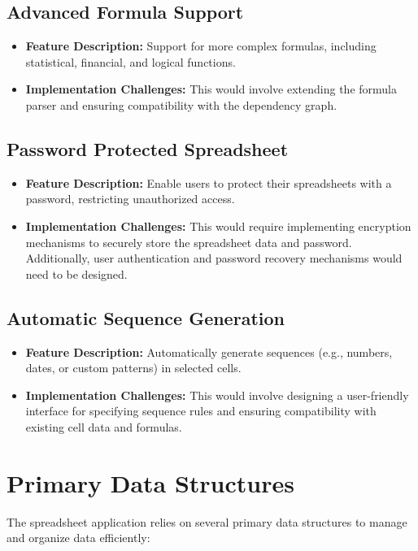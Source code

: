\documentclass{article}
\begin{document}
\subsection{Advanced Formula Support}
\begin{itemize}
    \item \textbf{Feature Description:} Support for more complex formulas, including statistical, financial, and logical functions.
    \item \textbf{Implementation Challenges:} This would involve extending the formula parser and ensuring compatibility with the dependency graph.
\end{itemize}

\subsection{Password Protected Spreadsheet}
\begin{itemize}
    \item \textbf{Feature Description:} Enable users to protect their spreadsheets with a password, restricting unauthorized access.
    \item \textbf{Implementation Challenges:} This would require implementing encryption mechanisms to securely store the spreadsheet data and password. Additionally, user authentication and password recovery mechanisms would need to be designed.
\end{itemize}

\subsection{Automatic Sequence Generation}
\begin{itemize}
    \item \textbf{Feature Description:} Automatically generate sequences (e.g., numbers, dates, or custom patterns) in selected cells.
    \item \textbf{Implementation Challenges:} This would involve designing a user-friendly interface for specifying sequence rules and ensuring compatibility with existing cell data and formulas.
\end{itemize}

\section{Primary Data Structures}
The spreadsheet application relies on several primary data structures to manage and organize data efficiently:
\end{document}
